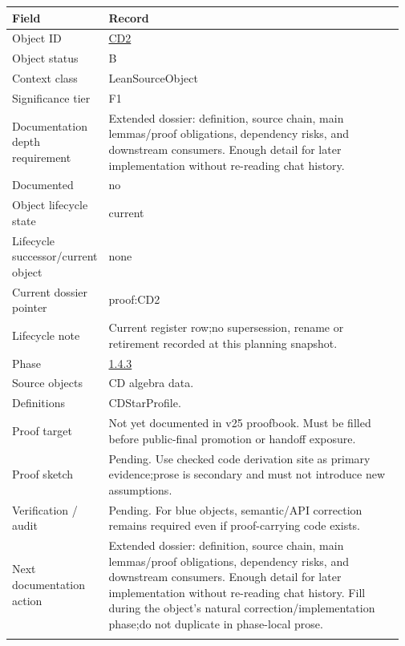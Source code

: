\begin{longtable}{L{0.16\linewidth} L{0.81\linewidth}}
\hline
\textbf{Field} & \textbf{Record}\\
\hline
Object ID & \hyperlink{object-row-CD2}{CD2}\\
\hline\addlinespace[0.20em]
Object status & B\\
\hline\addlinespace[0.20em]
Context class & LeanSourceObject\\
\hline\addlinespace[0.20em]
Significance tier & F1\\
\hline\addlinespace[0.20em]
Documentation depth requirement & Extended dossier: definition, source chain, main lemmas/\allowbreak{}proof obligations, dependency risks, and downstream consumers. Enough detail for later implementation without re-reading chat history.\\
\hline\addlinespace[0.20em]
Documented & no\\
\hline\addlinespace[0.20em]
Object lifecycle state & current\\
\hline\addlinespace[0.20em]
Lifecycle successor/\allowbreak{}current object & none\\
\hline\addlinespace[0.20em]
Current dossier pointer & proof:CD2\\
\hline\addlinespace[0.20em]
Lifecycle note & Current register row;\newline no supersession, rename or retirement recorded at this planning snapshot.\\
\hline\addlinespace[0.20em]
Phase & \hyperlink{phase-row-1-4-3}{1.4.3}\\
\hline\addlinespace[0.20em]
Source objects & CD algebra data.\\
\hline\addlinespace[0.20em]
Definitions & CDStarProfile.\\
\hline\addlinespace[0.20em]
Proof target & Not yet documented in v25 proofbook. Must be filled before public-final promotion or handoff exposure.\\
\hline\addlinespace[0.20em]
Proof sketch & Pending. Use checked code derivation site as primary evidence;\newline prose is secondary and must not introduce new assumptions.\\
\hline\addlinespace[0.20em]
Verification /\allowbreak{} audit & Pending. For blue objects, semantic/\allowbreak{}API correction remains required even if proof-carrying code exists.\\
\hline\addlinespace[0.20em]
Next documentation action & Extended dossier: definition, source chain, main lemmas/\allowbreak{}proof obligations, dependency risks, and downstream consumers. Enough detail for later implementation without re-reading chat history. Fill during the object's natural correction/\allowbreak{}implementation phase;\newline do not duplicate in phase-local prose.\\
\hline\addlinespace[0.20em]
\end{longtable}
